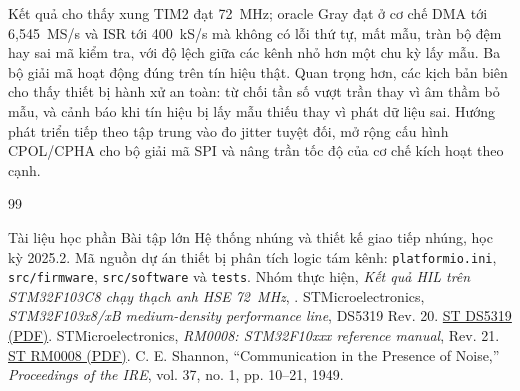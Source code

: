 Kết quả cho thấy xung TIM2 đạt 72~MHz; oracle Gray đạt ở cơ chế DMA tới 6,545~MS/s và ISR tới 400~kS/s mà không có lỗi thứ tự, mất mẫu, tràn bộ đệm hay sai mã kiểm tra, với độ lệch giữa các kênh nhỏ hơn một chu kỳ lấy mẫu. Ba bộ giải mã hoạt động đúng trên tín hiệu thật. Quan trọng hơn, các kịch bản biên cho thấy thiết bị hành xử an toàn: từ chối tần số vượt trần thay vì âm thầm bỏ mẫu, và cảnh báo khi tín hiệu bị lấy mẫu thiếu thay vì phát dữ liệu sai. Hướng phát triển tiếp theo tập trung vào đo jitter tuyệt đối, mở rộng cấu hình CPOL/CPHA cho bộ giải mã SPI và nâng trần tốc độ của cơ chế kích hoạt theo cạnh.

\renewcommand{\bibname}{TÀI LIỆU THAM KHẢO}
\begin{thebibliography}{99}
{}
 Tài liệu học phần Bài tập lớn Hệ thống nhúng và thiết kế giao tiếp nhúng, học kỳ 2025.2.
 Mã nguồn dự án thiết bị phân tích logic tám kênh: \texttt{platformio.ini}, \texttt{src/firmware}, \texttt{src/software} và \texttt{tests}.
 Nhóm thực hiện, \emph{Kết quả HIL trên STM32F103C8 chạy thạch anh HSE 72~MHz}, .
 STMicroelectronics, \emph{STM32F103x8/xB medium-density performance line}, DS5319 Rev. 20. \href{https://www.st.com/resource/en/datasheet/CD00161566.pdf}{ST DS5319 (PDF)}.
 STMicroelectronics, \emph{RM0008: STM32F10xxx reference manual}, Rev. 21. \href{https://www.st.com/resource/en/reference_manual/cd00171190-stm32f101xx-stm32f102xx-stm32f103xx-stm32f105xx-and-stm32f107xx-advanced-arm-based-32-bit-mcus-stmicroelectronics.pdf}{ST RM0008 (PDF)}.
 C. E. Shannon, “Communication in the Presence of Noise,” \emph{Proceedings of the IRE}, vol. 37, no. 1, pp. 10--21, 1949.
\end{thebibliography}

